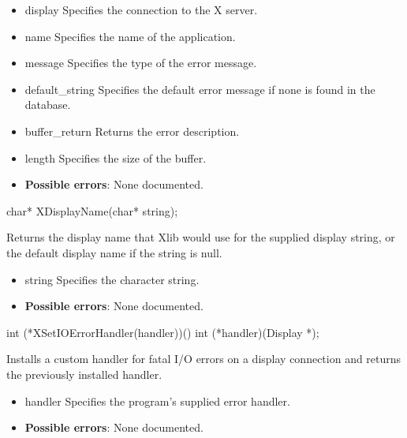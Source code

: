 \documentclass{report}
\begin{document}
\begin{itemize}
        \begin{itemize}
            \item display Specifies the connection to the X server.
            \item name Specifies the name of the application.
            \item message Specifies the type of the error message.
            \item default\_string Specifies the default error message if none is found in the database.
            \item buffer\_return Returns the error description.
            \item length Specifies the size of the buffer.
        \end{itemize}

        \begin{itemize}
            \item \textbf{Possible errors}: None documented.
        \end{itemize}

        \begin{cppcode}
            char* XDisplayName(char* string);
        \end{cppcode}
        \bigbreak \noindent
        Returns the display name that Xlib would use for the supplied display string, or the default display name if the string is null.

        \begin{itemize}
            \item string Specifies the character string.
        \end{itemize}

        \begin{itemize}
            \item \textbf{Possible errors}: None documented.
        \end{itemize}

        \begin{cppcode}
            int (*XSetIOErrorHandler(handler))()
                int (*handler)(Display *);
        \end{cppcode}
        \bigbreak \noindent
        Installs a custom handler for fatal I/O errors on a display connection and returns the previously installed handler.

        \begin{itemize}
            \item handler Specifies the program’s supplied error handler.
        \end{itemize}

        \begin{itemize}
            \item \textbf{Possible errors}: None documented.
        \end{itemize}



    \end{itemize}
\end{document}
